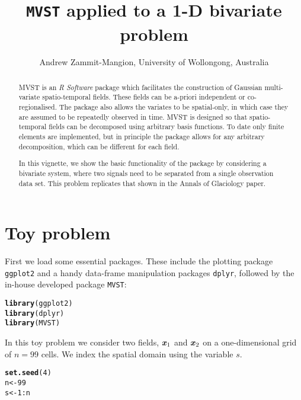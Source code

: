\documentclass{article}\usepackage[]{graphicx}\usepackage[]{color}
\title{\texttt{MVST} applied to a 1-D bivariate problem}
\author{Andrew Zammit-Mangion, University of Wollongong, Australia}
\makeatletter
\newcommand{\hlnum}[1]{\textcolor[rgb]{0.686,0.059,0.569}{#1}}%
\newcommand{\hlopt}[1]{\textcolor[rgb]{0,0,0}{#1}}%
\newcommand{\hlstd}[1]{\textcolor[rgb]{0.345,0.345,0.345}{#1}}%
\newcommand{\hlkwb}[1]{\textcolor[rgb]{0.69,0.353,0.396}{#1}}%
\newcommand{\hlkwd}[1]{\textcolor[rgb]{0.737,0.353,0.396}{\textbf{#1}}}%
\newenvironment{kframe}{%
 \def\at@end@of@kframe{}%
 \ifinner\ifhmode%
  \def\at@end@of@kframe{\end{minipage}}%
  \begin{minipage}{\columnwidth}%
 \fi\fi%
 \def\FrameCommand##1{\hskip\@totalleftmargin \hskip-\fboxsep
 \colorbox{shadecolor}{##1}\hskip-\fboxsep
     \hskip-\linewidth \hskip-\@totalleftmargin \hskip\columnwidth}%
 \MakeFramed {\advance\hsize-\width
   \@totalleftmargin\z@ \linewidth\hsize
   \@setminipage}}%
 {\par\unskip\endMakeFramed%
 \at@end@of@kframe}
\newenvironment{knitrout}{}{} %
\newcommand{\xvec} {\textbf{\textit{x}}}
\makeatother
\begin{document}

\maketitle

\begin{abstract}
MVST is an \emph{R Software} package which facilitates the 
construction of Gaussian multi-variate spatio-temporal fields. These fields can be
a-priori independent or co-regionalised. The package also allows the variates to be 
spatial-only, in which case they are assumed to be repeatedly observed in time.
MVST is designed so that spatio-temporal fields can be decomposed using arbitrary basis functions.
To date only finite elements are implemented, but in principle the package allows for any
arbitrary decomposition, which can be different for each field.

In this vignette, we show the basic functionality of the package by considering a bivariate system, where two signals need to be separated from a single observation data set. This problem replicates that shown in the Annals of Glaciology paper.

\end{abstract}


\section{Toy problem}

First we load some essential packages. These include the plotting package \texttt{ggplot2} and a handy data-frame manipulation packages \texttt{dplyr}, followed by the in-house developed package \texttt{MVST}:

\begin{knitrout}
\color{fgcolor}\begin{kframe}
\begin{alltt}
\hlkwd{library}\hlstd{(ggplot2)}
\hlkwd{library}\hlstd{(dplyr)}
\hlkwd{library}\hlstd{(MVST)}
\end{alltt}
\end{kframe}
\end{knitrout}

In this toy problem we consider two fields, $\xvec_1$ and $\xvec_2$ on a one-dimensional grid of $n = 99$ cells. We index the spatial domain using the variable $s$.

\begin{knitrout}
\color{fgcolor}\begin{kframe}
\begin{alltt}
\hlkwd{set.seed}\hlstd{(}\hlnum{4}\hlstd{)}
\hlstd{n} \hlkwb{<-} \hlnum{99}
\hlstd{s} \hlkwb{<-} \hlnum{1}\hlopt{:}\hlstd{n}
\end{alltt}
\end{kframe}
\end{knitrout}
\end{document}
